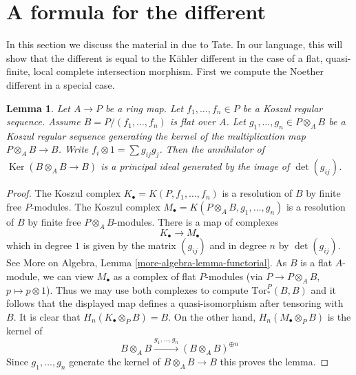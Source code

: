 \documentclass[10pt,a4paper]{amsart}
\theoremstyle{plain}
\newtheorem{lemma}[subsection]{Lemma}
\theoremstyle{definition}
\theoremstyle{remark}
\numberwithin{equation}{subsection}
\def\Ker{\mathop{\mathrm{Ker}}}
\newenvironment{reference}{}{}
\begin{document}
\section{A formula for the different}
\label{section-formula-different}

\noindent
In this section we discuss the material in \cite[Appendix A]{Mazur-Roberts}
due to Tate. In our language, this will show that the different is
equal to the K\"ahler different in the case of a flat, quasi-finite,
local complete intersection morphism.
First we compute the Noether different in a special case.

\begin{lemma}
\label{lemma-tate}
\begin{reference}
\cite[Appendix]{Mazur-Roberts}
\end{reference}
Let $A \to P$ be a ring map. Let $f_1, \ldots, f_n \in P$ be a
Koszul regular sequence. Assume $B = P/(f_1, \ldots, f_n)$
is flat over $A$. Let $g_1, \ldots, g_n \in P \otimes_A B$
be a Koszul regular sequence generating the kernel of the multiplication
map $P \otimes_A B \to B$. Write $f_i \otimes 1 = \sum g_{ij} g_j$.
Then the annihilator of $\Ker(B \otimes_A B \to B)$ is a principal
ideal generated by the image of $\det(g_{ij})$.
\end{lemma}

\begin{proof}
The Koszul complex $K_\bullet = K(P, f_1, \ldots, f_n)$ is a resolution
of $B$ by finite free $P$-modules. The Koszul complex
$M_\bullet = K(P \otimes_A B, g_1, \ldots, g_n)$ is a resolution
of $B$ by finite free $P \otimes_A B$-modules. There is a map of
complexes
$$
K_\bullet \longrightarrow M_\bullet
$$
which in degree $1$ is given by the matrix $(g_{ij})$ and
in degree $n$ by $\det(g_{ij})$. See
More on Algebra, Lemma \ref{more-algebra-lemma-functorial}.
As $B$ is a flat $A$-module, we can view $M_\bullet$ as a complex
of flat $P$-modules (via $P \to P \otimes_A B$, $p \mapsto p \otimes 1$).
Thus we may use both complexes to compute $\text{Tor}_*^P(B, B)$ and
it follows that the displayed map defines a quasi-isomorphism after tensoring
with $B$. It is clear that $H_n(K_\bullet \otimes_P B) = B$.
On the other hand, $H_n(M_\bullet \otimes_P B)$ is the kernel of
$$
B \otimes_A B \xrightarrow{g_1, \ldots, g_n} (B \otimes_A B)^{\oplus n}
$$
Since $g_1, \ldots, g_n$ generate the kernel of $B \otimes_A B \to B$
this proves the lemma.
\end{proof}
\end{document}

